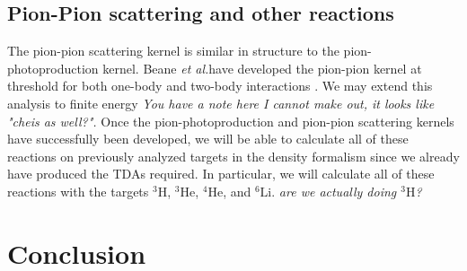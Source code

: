 \documentclass[a4paper,11pt]{article}
\newcommand{\etal}{\textit{et al.}}
\newcommand{\LiS}{{}^{6} \mathrm{Li} }
\newcommand{\HeF}{{}^{4} \mathrm{He}}
\newcommand{\HeT}{{}^{3} \mathrm{He}}
\newcommand{\HThree}{{}^{3} \mathrm{H}}
\newcommand{\ques}[1]{\color{red}\textit{ #1 }\color{black}}
\begin{document}
\subsection{Pion-Pion scattering and other reactions}
The pion-pion scattering kernel is similar in structure to the pion-photoproduction kernel.
Beane \etal have developed the pion-pion kernel at threshold for both one-body and two-body interactions \cite{Beane2003}.
We may extend this analysis to finite energy\ques{You have a note here I cannot make out, it looks like "cheis as well?".} 
Once the pion-photoproduction and pion-pion scattering kernels have successfully been developed, we will be able to calculate all of these reactions on previously analyzed targets in the density formalism since we already have produced the TDAs required.
In particular, we will calculate all of these reactions with the targets $\HThree$, $\HeT$, $\HeF$, and $\LiS$.\ques{are we actually doing $\HThree$?} 
\section{Conclusion}
\end{document}
